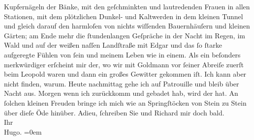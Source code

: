 \begin{ledgroupsized}[t]{13cm}
               Kupfernägeln der Bänke, mit den geſchminkten und lautredenden {\pb}Frauen in allen Stationen, mit dem
               plötzlichen Dunkel- und Kaltwerden in dem kleinen Tunnel und gleich darauf den
               harmloſen von nichts wiſſenden Bauernhäuſern und kleinen Gärten; am Ende mehr die
               ſtundenlangen Geſpräche in der Nacht im Regen, im Wald und auf der weißen naſſen
               Landſtraße mit Edgar und das ſo ſtarke
               aufgeregte Fühlen von ſein und meinem Leben wie in einem.\pend
           \pstart
           Als ein beſonders merkwürdiger \label{K_L00464-2v}\label{K_L00464-2h} erſcheint mir der, wo wir mit Goldmann
               vor ſeiner Abreiſe zuerſt beim Leopold waren und
               dann ein großes Gewitter gekommen iſt. Ich kann aber nicht finden, warum.\pend
           \pstart
           {\pb}Heute nachmittag gehe ich auf
               Patrouille und bleib über Nacht aus. Morgen wenn ich zurückkomm und gebadet hab, wird
               der \label{K_L00464-3v}\label{K_L00464-3h} hat. An ſolchen
               kleinen Freuden bringe ich mich wie an Springſtöcken von Stein zu Stein über dieſe
               Öde hinüber.\pend
           \pstart
           Adieu, ſchreiben Sie und Richard mir doch
               bald.{\\[\baselineskip]} Ihr{\\[\baselineskip]}\spacefill\mbox{Hugo.}\pend
           \leftskip=0em{}
         
         \endnumbering{}\end{ledgroupsized}  \newcommand{\dateiname}{L00464}\newcommand{\titel}{Hugo von Hofmannsthal an Arthur Schnitzler, 17. [7. 1895]}\newcommand{\editorInnen}{Martin Anton Müller und Gerd-Hermann Susen}
      